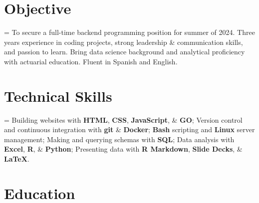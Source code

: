 \documentclass[12pt]{article}
\newcommand{\itemspace}{\vspace{0.3170em}}
\renewcommand{\textsc}[1]{\uppercase{\footnotesize#1}\normalsize}
\begin{document}
\maketitle

\vspace{-2.8mm}
\noindent\hrulefill

\vspace{-4.5mm}
\noindent\hrulefill

\itemspace
\section{Objective}

\hangindent=\parindent %
To secure a full-time backend programming position for summer of 2024.
Three years experience in coding projects, strong leadership \& communication
skills, and passion to learn. Bring data science background and analytical
proficiency with actuarial education. Fluent in Spanish and English.

\itemspace

\section{Technical Skills}

\hangindent=\parindent %
Building websites with \textbf{\textsc{html}}, \textbf{\textsc{css}},
  \textbf{JavaScript}, \& \textbf{\textsc{go}};
Version control and continuous integration with \textbf{git} \& \textbf{Docker};
\textbf{Bash} scripting and \textbf{Linux} server management;
Making and querying schemas with \textbf{\textsc{sql}};
Data analysis with \textbf{Excel}, \textbf{\textsc{r}}, \& \textbf{Python};
Presenting data with \textbf{R Markdown}, \textbf{Slide Decks}, \& \textbf{\LaTeX{}}.

\itemspace

\section{Education}
\end{document}
